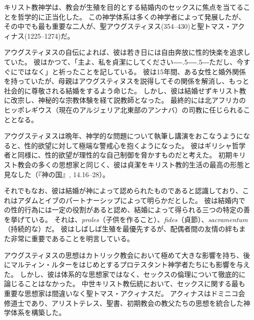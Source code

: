 \documentclass[paper=a4,book,openany]{jlreq}
\def\DDASH{―\kern-.5\zw―\kern-.5\zw―} %
\begin{document}
キリスト教神学は、教会が生殖を目的とする結婚内のセックスに焦点を当てることを哲学的に正当化した。
この神学体系は多くの神学者によって発展したが、その中でも最も重要な二人が、聖アウグスティヌス(354--430)と聖トマス・アクィナス(1225--1274)だ。

アウグスティヌスの自伝によれば、彼は若き日には自由奔放に性的快楽を追求していた。
彼はかつて、「主よ、私を貞潔にしてください{\DDASH}ただし、今すぐにではなく」と祈ったことを記している。
彼は15年間、ある女性と婚外関係を持っていたが、母親はアウグスティヌスを説得してその関係を解消し、もっと社会的に尊敬される結婚をするよう命じた。
しかし、彼は結婚せずキリスト教に改宗し、神秘的な宗教体験を経て説教師となった。
最終的には北アフリカのヒッポレギウス（現在のアルジェリア北東部のアンナバ）の司教に任じられることとなる。

アウグスティヌスは晩年、神学的な問題について執筆し講演をおこなうようになると、性的欲望に対して極端な警戒心を抱くようになった。
彼はギリシャ哲学者と同様に、性的欲望が理性的な自己制御を脅かすものだと考えた。
初期キリスト教会の多くの思想家と同じく、彼は貞潔をキリスト教的生活の最高の形態と見なした（『神の国』, 14.16--28）。

\nocite{augustine98:_city_god_pagan}
\nocite{アウグスティヌス82岩波}
\nocite{アウグスティヌス76:告白岩波}

それでもなお、彼は結婚が神によって認められたものであると認識しており、これはアダムとイブのパートナーシップによって明らかだとした。
彼は結婚内での性的行為には一定の役割があると認め、結婚によって得られる三つの特定の善を挙げている。
それは、\emph{proles}（子供を作ること）、\emph{fides}（貞節）、\emph{sacramentum}（持続的な）だ。
彼はしばしば生殖を最優先するが、配偶者間の友情の絆もまた非常に重要であることを明言している\citep{augustine98:_excel_marriag}。

アウグスティヌスの思想はカトリック教会において極めて大きな影響を持ち、後にマルティン・ルターをはじめとするプロテスタント神学者たちにも影響を与えた。
しかし、彼は体系的な思想家ではなく、セックスの倫理について徹底的に論じることはなかった。
中世キリスト教伝統において、セックスに関する最も重要な思想家は間違いなく聖トマス・アクィナスだ。
アクィナスはドミニコ会修道士であり、アリストテレス、聖書、初期教会の教父たちの思想を統合した神学体系を構築した。
\end{document}
